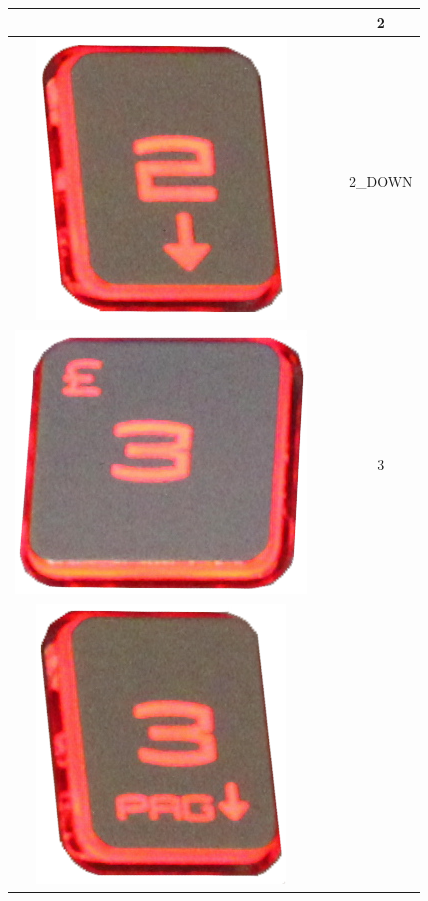 \begin{longtable}{cccc}
\begin{minipage}[c]{.3\textwidth}
\vspace{0.2cm}
\end{minipage} & & & 2\\
\hline
\begin{minipage}[c]{.3\textwidth}
\vspace{0.2cm}
\includegraphics[scale=0.1]{Images/KeyMapping/2_DOWN}
\vspace{0.2cm}
\end{minipage} & & & 2\_DOWN\\
\hline
\begin{minipage}[c]{.3\textwidth}
\vspace{0.2cm}
\includegraphics[scale=0.1]{Images/KeyMapping/3}
\vspace{0.2cm}
\end{minipage} & & & 3\\
\hline
\begin{minipage}[c]{.3\textwidth}
\vspace{0.2cm}
\includegraphics[scale=0.1]{Images/KeyMapping/3_PAGE_DOWN}

\end{minipage}
\end{longtable}
